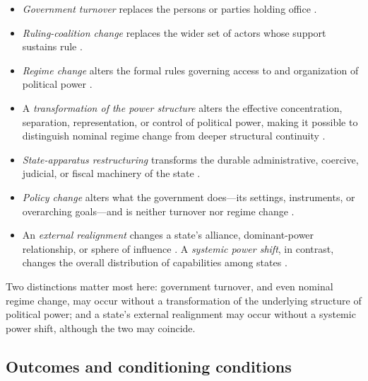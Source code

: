\documentclass[11pt]{article}
\begin{document}
\begin{itemize}
	\item \emph{Government turnover} replaces the persons or parties holding office \parencite{bueno_de_mesquita_2003}.
	\item \emph{Ruling-coalition change} replaces the wider set of actors whose support sustains rule \parencite{bueno_de_mesquita_2003}.
	\item \emph{Regime change} alters the formal rules governing access to and organization of political power \parencite{linz_stepan_1996}. 
	\item A \emph{transformation of the power structure} alters the effective concentration, separation, representation, or control of political power, making it possible to distinguish nominal regime change from deeper structural continuity \parencite{garciatrevijano2010}.
	\item \emph{State-apparatus restructuring} transforms the durable administrative, coercive, judicial, or fiscal machinery of the state \parencite{skocpol_1979,althusser_1971}. 
	\item \emph{Policy change} alters what the government does---its settings, instruments, or overarching goals---and is neither turnover nor regime change \parencite{hall_1993}.
	\item An \emph{external realignment} changes a state's alliance, dominant-power relationship, or sphere of influence \parencite{walt_1987}. A \emph{systemic power shift}, in contrast, changes the overall distribution of capabilities among states \parencite{gilpin_1981,waltz_1979}.
\end{itemize}

Two distinctions matter most here: government turnover, and even nominal regime change, may occur without a transformation of the underlying structure of political power; and a state's external realignment may occur without a systemic power shift, although the two may coincide.

\subsection{Outcomes and conditioning conditions}
\end{document}

